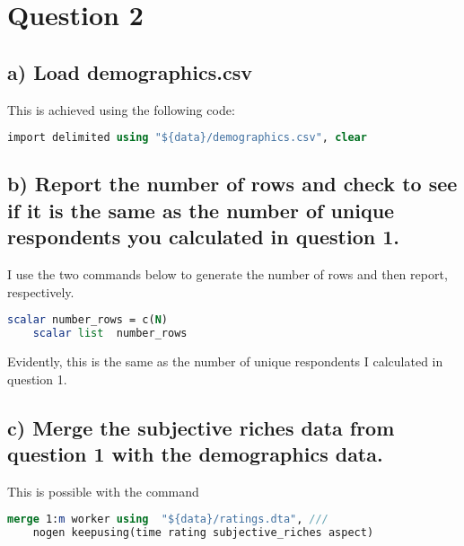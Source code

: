 \documentclass[12pt,a4paper]{article}
\begin{document}
\section*{{\textcolor[rgb]{0.0667, 0.1255, 0.1922}{Question 2}}}
	\subsection*{\normalsize{a) Load demographics.csv}}
	
	\noindent
	This is achieved using the following code:
	
	\begin{lstlisting}[language=Stata]
	import delimited using "${data}/demographics.csv", clear
	\end{lstlisting}
	
	\subsection*{\normalsize{b) Report the number of rows and check to see if it is the same as the number of unique respondents you calculated in question 1.}}
	
	\noindent
	I use the two commands below to generate the number of rows and then report, respectively.
	
	\begin{lstlisting}[language=Stata]
	scalar number_rows = c(N)
	scalar list  number_rows
	\end{lstlisting}
	
	Evidently, this is the same as the number of unique respondents I calculated in question 1.
	
	\subsection*{\normalsize{c) Merge the subjective riches data from question 1 with the demographics data.}}
	
	\noindent
	This is possible with the command
	\begin{lstlisting}[language=Stata]
	merge 1:m worker using  "${data}/ratings.dta", ///
	nogen keepusing(time rating subjective_riches aspect)
	\end{lstlisting}

\begin{table}[htbp]
\end{table}
\end{document}
